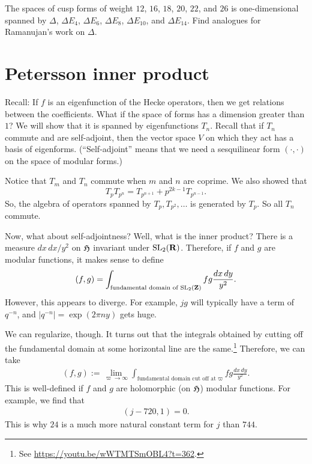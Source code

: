 \documentclass[11pt, oneside,margin=1in]{article}
\begin{document}
\begin{exercise}\label{}\text{}
The spaces of cusp forms of weight $12$, $16$, $18$, $20$, $22$, and $26$ is one-dimensional spanned by $\Delta$, $\Delta E_4$, $\Delta E_6$, $\Delta E_8$, $\Delta E_{10}$, and $\Delta E_{14}$. Find analogues for Ramanujan's work on $\Delta$.
\end{exercise}


\section{Petersson inner product}

Recall: If $f$ is an eigenfunction of the Hecke operators, then we get relations between the coefficients. What if the space of forms has a dimension greater than $1$? We will show that it is spanned by eigenfunctions $T_n$. Recall that if $T_n$ commute and are self-adjoint, then the vector space $V$ on which they act has a basis of eigenforms. (``Self-adjoint'' means that we need a sesquilinear form $(\cdot,\cdot)$ on the space of modular forms.)

Notice that $T_m$ and $T_n$ commute when $m$ and $n$ are coprime. We also showed that 
\[
	T_pT_{p^n} = T_{p^{n+1}} + p^{2k-1}T_{p^{n-1}}.
\]
So, the algebra of operators spanned by $T_p,T_{p^2},\hdots$ is generated by $T_p$. So all $T_n$ commute.

Now, what about self-adjointness? Well, what is the inner product? There is a measure $dx\,dx/y^2$ on $\mathfrak H$ invariant under $\operatorname{SL}_{2}(\mathbf R)$. Therefore, if $f$ and $g$ are modular functions, it makes sense to define
\begin{align*}
	(f,g) =  \int_{\textrm{fundamental domain of $\operatorname{SL}_{2}(\mathbf Z)$}} fg\frac{dx\,dy}{y^2}. 
\end{align*}
However, this appears to diverge. For example, $jg$ will typically have a term of $q^{-n}$, and $\left\lvert q^{-n} \right\rvert = \exp(2\pi ny)$ gets huge.

We can regularize, though. It turns out that the integrals obtained by cutting off the fundamental domain at some horizontal line are the same.\footnote{See \url{https://youtu.be/wWTMTSmOBL4?t=362}.} Therefore, we can take
\begin{align*}
	(f,g) := \lim_{\varpi\to\infty}  \int_{\textrm{fundamental domain cut off at $\varpi$} }fg\frac{dx\,dy}{y^2}. 
\end{align*}
This is well-defined if $f$ and $g$ are holomorphic (on $\mathfrak H$) modular functions. For example, we find that
\begin{align*}
	(j-720, 1) = 0.
\end{align*}
This is why $24$ is a much more natural constant term for $j$ than $744$.
\end{document}
